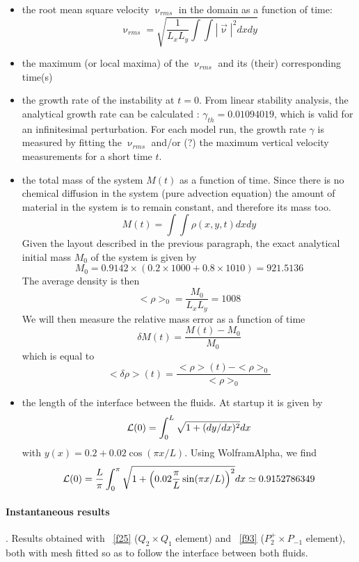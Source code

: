 \begin{itemize}

\item the root mean square velocity $\upnu_{rms}$ in the domain as a function of time:
\begin{equation}
\upnu_{rms}= \sqrt{ \frac{1}{L_xL_y} \int \int |{\vec \upnu}|^2 dxdy}
\end{equation}

\item the maximum (or local maxima) of the $\upnu_{rms}$ and 
its (their) corresponding time(s)

\item the growth rate of the instability at $t=0$.
From linear stability analysis, the analytical growth rate can 
be calculated \cite{ramb68,ramb81}: 
$\gamma_{th}=0.01094019$, which is valid for an infinitesimal perturbation. 
For each model run, the growth rate $\gamma$ is measured by fitting 
the $\upnu_{rms}$ and/or (?) the maximum 
vertical velocity measurements for a short time $t$. 

\item the total mass of the system $M(t)$ as a function of time. 
Since there is no chemical diffusion in the 
system (pure advection equation) the amount of material in the system 
is to remain constant, and therefore its mass too.
\begin{equation}
M(t) = \int \int \rho(x,y,t) dxdy
\end{equation}
Given the layout described in the previous paragraph, the exact 
analytical initial mass $M_0$ of the system is given by 
\[
M_0=0.9142 \times (0.2 \times 1000 + 0.8\times 1010) = 921.5136
\]
The average density is then 
\[
<\rho>_0=\frac{M_0}{L_xL_y} = 1008
\]
We will then measure the relative mass error as a function of time
\[
\delta M(t) = \frac{M(t)-M_0}{M_0}
\]
which is equal to 
\[
<\delta\rho>(t) = \frac{<\rho>(t)-<\rho>_0}{<\rho>_0}
\]

\item the length of the interface between the fluids. At startup it is given by 
\[
{\cal L}(0) = \int_0^L \sqrt{1 + (dy/dx)^2} dx
\]
with $y(x)=0.2+0.02\cos(\pi x/L)$. Using WolframAlpha, we find
\[
{\cal L}(0)= \frac{L}{\pi} \int_0^\pi \sqrt{1 + 
\left(0.02\frac{\pi}{L}\sin(\pi x /L) \right)^2} dx
\simeq 0.9152786349
\]

\end{itemize}


\paragraph{Instantaneous results}.
Results obtained with \stone~\ref{f25} ($Q_2\times Q_1$ element) 
and \stone~\ref{f93} ($P_2^+\times P_{-1}$ element), 
both with mesh fitted so as to follow the interface between both fluids.

